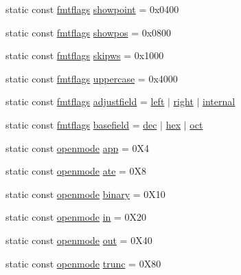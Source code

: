 \begin{DoxyCompactItemize}
\item 
static const \hyperlink{classios__base_ac9a54e52cef4f01ac0afd8ae896a3413}{fmtflags} \hyperlink{classios__base_ac9bb172682e157f037bd7fb82a236ee6}{showpoint} = 0x0400
\item 
static const \hyperlink{classios__base_ac9a54e52cef4f01ac0afd8ae896a3413}{fmtflags} \hyperlink{classios__base_a7bfa4a883933105d10f8ce2693cb9f21}{showpos} = 0x0800
\item 
static const \hyperlink{classios__base_ac9a54e52cef4f01ac0afd8ae896a3413}{fmtflags} \hyperlink{classios__base_a64977c777d6e45826d1be9763f17f824}{skipws} = 0x1000
\item 
static const \hyperlink{classios__base_ac9a54e52cef4f01ac0afd8ae896a3413}{fmtflags} \hyperlink{classios__base_ade3db1fe3249e87f4c47a9a8916793d9}{uppercase} = 0x4000
\item 
static const \hyperlink{classios__base_ac9a54e52cef4f01ac0afd8ae896a3413}{fmtflags} \hyperlink{classios__base_adaaf735381254aa096ebe3605e8bbd0a}{adjustfield} = \hyperlink{classios__base_ad364df9af2cfde1f40bd8e10c62bb215}{left} $\vert$ \hyperlink{classios__base_aec064a12730b5d87e718c1864e29ac64}{right} $\vert$ \hyperlink{classios__base_afc720b7f6f461ec8e9cf5505059e5d7c}{internal}
\item 
static const \hyperlink{classios__base_ac9a54e52cef4f01ac0afd8ae896a3413}{fmtflags} \hyperlink{classios__base_a75ce5482aa207d7aa0265d138b50a102}{basefield} = \hyperlink{classios__base_a2826aed005e7c1f6858060cddae7971a}{dec} $\vert$ \hyperlink{classios__base_a3608e51eb0a80ea94ddadd5b713a3750}{hex} $\vert$ \hyperlink{classios__base_a4155540f8d3ffdb8d25a2f50ee4df08f}{oct}
\item 
static const \hyperlink{classios__base_aaa192ec0dccc43050715553a34644523}{openmode} \hyperlink{classios__base_a8380aac3c405730708888fdc68905820}{app} = 0\+X4
\item 
static const \hyperlink{classios__base_aaa192ec0dccc43050715553a34644523}{openmode} \hyperlink{classios__base_aa434355c165500065276d955d8b36e99}{ate} = 0\+X8
\item 
static const \hyperlink{classios__base_aaa192ec0dccc43050715553a34644523}{openmode} \hyperlink{classios__base_ac99947c17c2936d15243671366605602}{binary} = 0\+X10
\item 
static const \hyperlink{classios__base_aaa192ec0dccc43050715553a34644523}{openmode} \hyperlink{classios__base_ae5432e3c269064480652c4602f5f74ad}{in} = 0\+X20
\item 
static const \hyperlink{classios__base_aaa192ec0dccc43050715553a34644523}{openmode} \hyperlink{classios__base_a4c1d517774c0d11af3424e90395f26ae}{out} = 0\+X40
\item 
static const \hyperlink{classios__base_aaa192ec0dccc43050715553a34644523}{openmode} \hyperlink{classios__base_ae62b8972f37509819e1384214071194b}{trunc} = 0\+X80
\end{DoxyCompactItemize}
